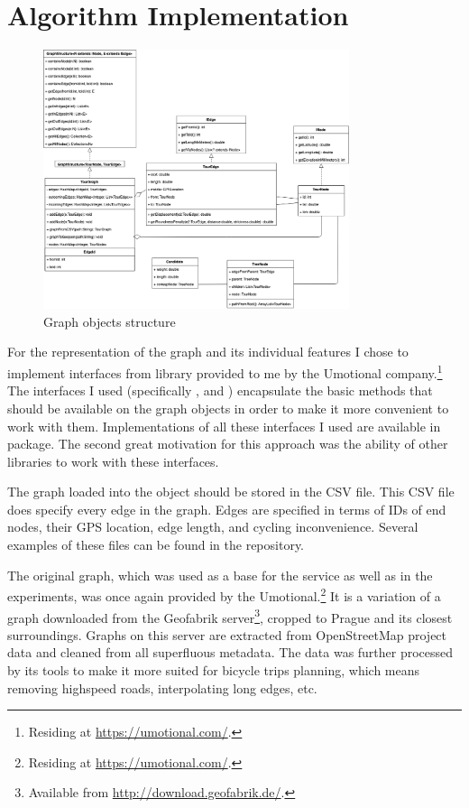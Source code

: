 \documentclass{ctuthesis}
\begin{document}
\section{Algorithm Implementation} \label{sec:solutionImpl}
\begin{figure}
	\includegraphics[width=0.8\textwidth]{graph.png}
	\caption{Graph objects structure}
	\label{fig:coreGraph}
\end{figure}

For the representation of the graph and its individual features I chose to implement interfaces from  library provided to me by the Umotional company.\footnote{Residing at \url{https://umotional.com/}.} The interfaces I used (specifically ,  and ) encapsulate the basic methods that should be available on the graph objects in order to make it more convenient to work with them. Implementations of all these interfaces I used are available in  package. The second great motivation for this approach was the ability of other libraries to work with these interfaces. \par
The graph loaded into the  object should be stored in the CSV file. This CSV file does specify every edge in the graph. Edges are specified in terms of IDs of end nodes, their GPS location, edge length, and cycling inconvenience. Several examples of these files can be found in the repository\cite{git}. \par
The original graph, which was used as a base for the service as well as in the experiments, was once again provided by the Umotional.\footnote{Residing at \url{https://umotional.com/}.} It is a variation of a graph downloaded from the Geofabrik server\footnote{Available from \url{http://download.geofabrik.de/}.}, cropped to Prague and its closest surroundings. Graphs on this server are extracted from OpenStreetMap project data and cleaned from all superfluous metadata. The data was further processed by its tools to make it more suited for bicycle trips planning, which means removing highspeed roads, interpolating long edges, etc. \par
\end{document}
